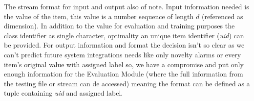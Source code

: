 \documentclass[conference]{IEEEtran}
\begin{document}

The stream format for input and output also of note.
Input information needed is the value of the item, this value is a number
sequence of length $d$ (referenced as dimension).
In addition to the value for evaluation and training purposes the class
identifier as single character, optimality an unique item identifier
(\textit{uid}) can be provided.
For output information and format the decision isn't so clear as we can't
predict future system integrations needs like only novelty alarms or every
item's original value with assigned label so, we have a compromise and put only
enough information for the Evaluation Module (where the full information
from the testing file or stream can de accessed) meaning the format can be
defined as a tuple containing \textit{uid} and assigned label.

\end{document}
